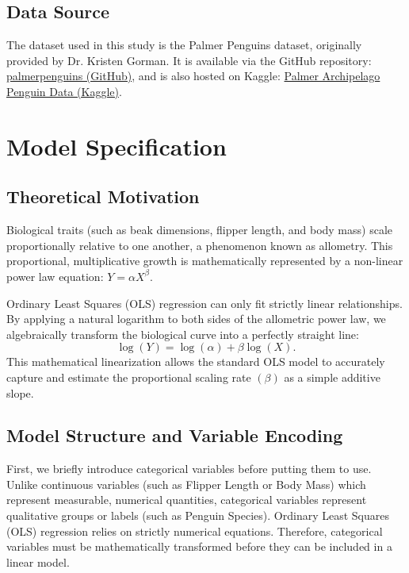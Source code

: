 \documentclass[12pt]{article}
\begin{document}
\subsection{Data Source}

The dataset used in this study is the Palmer Penguins\cite{palmerpenguins}
dataset, originally provided by Dr. Kristen Gorman. It is
available via the GitHub repository:
\href{https://github.com/allisonhorst/palmerpenguins/tree/main}
{palmerpenguins (GitHub)}, and is also hosted on Kaggle:
\href{https://www.kaggle.com/datasets/parulpandey/palmer-archipelago-antarctica-penguin-data}
{Palmer Archipelago Penguin Data (Kaggle)}.

\section{Model Specification}

\subsection{Theoretical Motivation}

Biological traits (such as beak dimensions, flipper length,
and body mass) scale proportionally relative to one another,
a phenomenon known as allometry.
This proportional, multiplicative growth is
mathematically represented by a
non-linear power law equation: $Y = \alpha X^{\beta}$.

Ordinary Least Squares (OLS) regression can only
fit strictly linear relationships.
By applying a natural logarithm to both sides of the
allometric power law, we algebraically transform the
biological curve into a perfectly straight line:
\[
  \log(Y) = \log(\alpha) + \beta \log(X)
.\]
This mathematical linearization allows the standard OLS model
to accurately capture and estimate the proportional scaling rate
$(\beta)$ as a simple additive slope.

\subsection{Model Structure and Variable Encoding}

First, we briefly introduce categorical variables before putting them
to use. Unlike continuous variables
(such as Flipper Length or Body Mass) which represent measurable,
numerical quantities, categorical variables
represent qualitative groups or labels (such as Penguin Species).
Ordinary Least Squares (OLS) regression relies on
strictly numerical equations.
Therefore, categorical variables must be mathematically transformed
before they can be included in a linear model.
\end{document}
